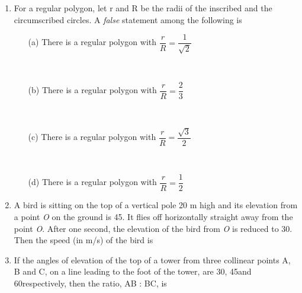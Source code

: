 \documentclass[journal,12pt,twocolumn]{IEEEtran}
\begin{document}
\begin{enumerate}
\begin{itemize}
 \end{itemize}  
 \item For a regular polygon, let r and R be the radii of the inscribed and the circumscribed circles. A \textsl{false} statement among the following is
 \begin{itemize}
 \item[(a)] There is a regular polygon with $\dfrac{r}{R}=\dfrac{1}{\sqrt{2}}$ \item[~]
 \item[(b)] There is a regular polygon with $\dfrac{r}{R}=\dfrac{2}{3}$ \item[~]
 \item[(c)] There is a regular polygon with $\dfrac{r}{R}=\dfrac{\sqrt{3}}{2}$ \item[~]
 \item[(d)] There is a regular polygon with $\dfrac{r}{R}=\dfrac{1}{2}$
 \end{itemize}  
 \item A bird is sitting on the top of a vertical pole 20 m high and its elevation from a point \textsl{O} on the ground is 45\degree. It flies off horizontally straight away from the point \textsl{O}. After one second, the elevation of the bird from \textsl{O} is reduced to 30\degree. Then the speed (in m/s) of the bird is
 \begin{itemize}
 \end{itemize}
 \item If the angles of elevation of the top of a tower from three collinear points A, B and C, on a line leading to the foot of the tower, are 30\degree, 45\degree and 60\degree respectively, then the ratio, AB : BC, is

\end{enumerate}
\end{document}
